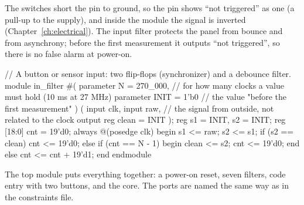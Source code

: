 The switches short the pin to ground, so the pin shows ``not triggered'' as one
(a pull-up to the supply), and inside the module the signal is inverted
(Chapter~\ref{ch:electrical}). The input filter protects the panel from bounce
and from asynchrony; before the first measurement it outputs ``not triggered'',
so there is no false alarm at power-on.

\begin{vcode}
// A button or sensor input: two flip-flops (synchronizer) and a debounce filter.
module in_filter #(
    parameter N    = 270_000,    // for how many clocks a value must hold (10 ms at 27 MHz)
    parameter INIT = 1'b0        // the value "before the first measurement"
) (
    input      clk,
    input      raw,              // the signal from outside, not related to the clock
    output reg clean = INIT
);
    reg s1 = INIT, s2 = INIT;
    reg [18:0] cnt = 19'd0;
    always @(posedge clk) begin
        s1 <= raw;
        s2 <= s1;
        if (s2 == clean)          cnt <= 19'd0;
        else if (cnt == N - 1) begin clean <= s2; cnt <= 19'd0; end
        else                      cnt <= cnt + 19'd1;
    end
endmodule

\end{vcode}

The top module puts everything together: a power-on reset, seven filters, code
entry with two buttons, and the core. The ports are named the same way as in the
constraints file.

